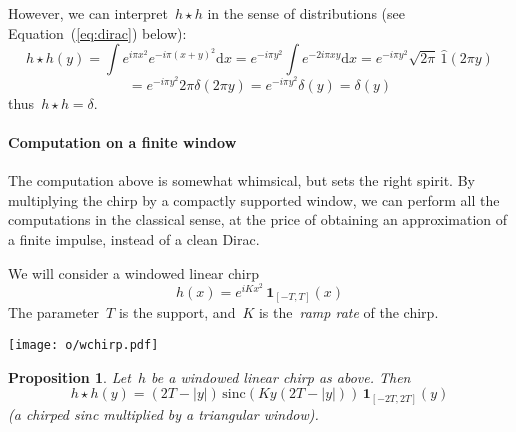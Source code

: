 \documentclass[a4paper]{article}           %
\newtheorem{proposition}[theorem]{Proposition}
\newcommand{\1}{\mathbf{1}}
\newcommand{\ud}{\mathrm{d}}
\newcommand{\abs}[1]{\left|#1\right|}
\newcommand{\paren}[1]{\left(#1\right)}
\begin{document}
However, we can interpret~$h\star h$ in the sense of distributions (see
Equation~(\ref{eq:dirac}) below):
$$
h\star h (y)
=
\int e^{i\pi x^2}e^{-i\pi(x+y)^2}\ud x
=
e^{-i\pi y^2}
\int e^{-2i\pi xy}
\ud x
=
e^{-i\pi y^2}\sqrt{2\pi}\, \widehat{1}\paren{2\pi y}
$$
$$
=
e^{-i\pi y^2}2\pi\delta\paren{2\pi y}
=
e^{-i\pi y^2}\delta(y)
=\delta(y)
$$
thus~$h\star h=\delta$.


\paragraph{Computation on a finite window}
The computation above is somewhat whimsical, but sets the right spirit.  By
multiplying the chirp by a compactly supported window, we can perform all the
computations in the classical sense,  at the price of obtaining an
approximation of a finite impulse, instead of a clean Dirac.

We will consider a windowed linear chirp
$$
h(x)
=
e^{iKx^2}
\,
\1_{[-T,T]}(x)
$$
The parameter~$T$ is the support, and~$K$ is the~\emph{ramp rate}
of the chirp.


\texttt{[image: o/wchirp.pdf]}

\clearpage
\begin{proposition}
	Let~$h$ be a windowed linear chirp as above.  Then
	\[
		h\star h(y)=
		\paren{2T-\abs{y}}
		\,
		\mathrm{sinc}\paren{ Ky\paren{2T-\abs{y}} }
		\,
		\1_{[-2T,2T]}(y)
	\]
	(a chirped sinc multiplied by a triangular window).
\end{proposition}
\end{document}
